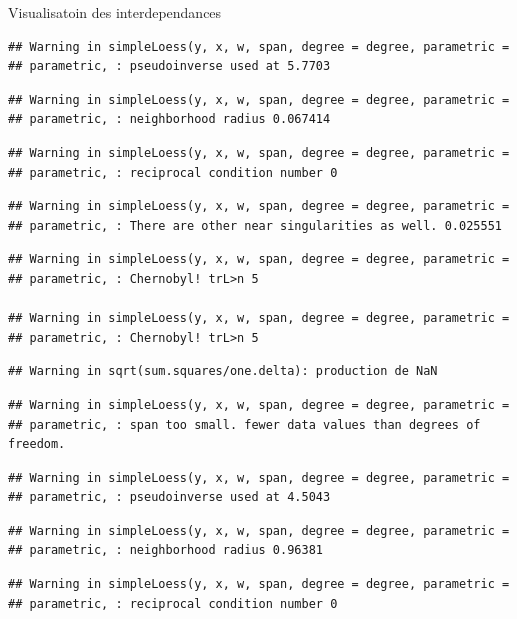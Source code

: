 \documentclass[11pt,ignorenonframetext,]{beamer}
\begin{document}
\begin{frame}[fragile]{Visualisatoin des interdependances}
\begin{verbatim}
## Warning in simpleLoess(y, x, w, span, degree = degree, parametric =
## parametric, : pseudoinverse used at 5.7703
\end{verbatim}

\begin{verbatim}
## Warning in simpleLoess(y, x, w, span, degree = degree, parametric =
## parametric, : neighborhood radius 0.067414
\end{verbatim}

\begin{verbatim}
## Warning in simpleLoess(y, x, w, span, degree = degree, parametric =
## parametric, : reciprocal condition number 0
\end{verbatim}

\begin{verbatim}
## Warning in simpleLoess(y, x, w, span, degree = degree, parametric =
## parametric, : There are other near singularities as well. 0.025551
\end{verbatim}

\begin{verbatim}
## Warning in simpleLoess(y, x, w, span, degree = degree, parametric =
## parametric, : Chernobyl! trL>n 5

## Warning in simpleLoess(y, x, w, span, degree = degree, parametric =
## parametric, : Chernobyl! trL>n 5
\end{verbatim}

\begin{verbatim}
## Warning in sqrt(sum.squares/one.delta): production de NaN
\end{verbatim}

\begin{verbatim}
## Warning in simpleLoess(y, x, w, span, degree = degree, parametric =
## parametric, : span too small. fewer data values than degrees of freedom.
\end{verbatim}

\begin{verbatim}
## Warning in simpleLoess(y, x, w, span, degree = degree, parametric =
## parametric, : pseudoinverse used at 4.5043
\end{verbatim}

\begin{verbatim}
## Warning in simpleLoess(y, x, w, span, degree = degree, parametric =
## parametric, : neighborhood radius 0.96381
\end{verbatim}

\begin{verbatim}
## Warning in simpleLoess(y, x, w, span, degree = degree, parametric =
## parametric, : reciprocal condition number 0
\end{verbatim}


\end{frame}
\end{document}

